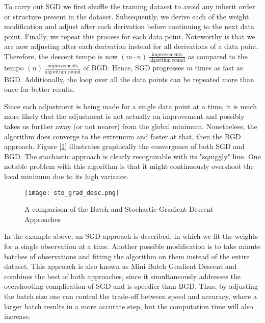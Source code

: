 		\par
	
		To carry out SGD we first shuffle the training dataset to avoid any inherit order or structure present in the dataset. Subsequently, we derive each of the weight modification and adjust after each derivation before continuing to the next data point. Finally, we repeat this process for each data point. Noteworthy is that we are now adjusting after each derivation instead for all derivations of a data point. Therefore, the descent tempo is now $ (m \cdot n) \ \frac{\text{improvements}}{\text{algorithm round}}$ as compared to the tempo $(n) \ \frac{\text{improvements}}{\text{algorithm round}}$ of BGD. Hence, SGD progresses $ m $ times as fast as BGD. Additionally, the loop over all the data points can be repeated more than once for better results.
		
		\par
		
		Since each adjustment is being made for a single data point at a time, it is much more likely that the adjustment is not actually an improvement and possibly takes us further away (or not nearer) from the global minimum. Nonetheless, the algorithm does converge to the extremum and faster at that, then the BGD approach.  Figure [\ref{ann_sto_grad_desc}] illustrates graphically the convergence of both SGD and BGD. The stochastic approach is clearly recognizable with its "squiggly" line. One notable problem with this algorithm is that it might continuously overshoot the local minimum due to its high variance.
		
		\begin{figure}[H]
			\centering
			\captionsetup{width=0.8\textwidth}
			\texttt{[image: sto\_grad\_desc.png]}
			\caption[Batch and Stochastic Gradient Descent]{
				\footnotesize{
					A comparison of the Batch and Stochastic Gradient Descent Approaches 
				}
			} 
			\label{ann_sto_grad_desc}
		\end{figure}
	
		In the example above, an SGD approach is described, in which we fit the weights for a single observation at a time. Another possible modification is to take minute batches of observations and fitting the algorithm on them instead of the entire dataset. This approach is also known as Mini-Batch Gradient Descent and combines the best of both approaches, since it simultaneously addresses the overshooting complication of SGD and is speedier than BGD. Thus, by adjusting the batch size one can control the trade-off between speed and accuracy, where a larger batch results in a more accurate step, but the computation time will also increase. 
		
